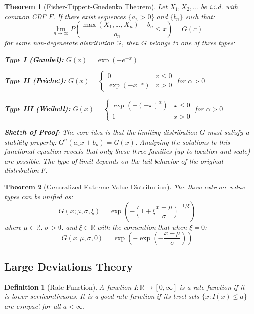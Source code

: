 \documentclass[12pt,a4paper]{article}
\newtheorem{theorem}{Theorem}[section]
\newtheorem{definition}{Definition}[section]
\theoremstyle{remark}
\begin{document}
\begin{theorem}[Fisher-Tippett-Gnedenko Theorem]
Let $X_1, X_2, \ldots$ be i.i.d. with common CDF $F$. If there exist sequences $\{a_n > 0\}$ and $\{b_n\}$ such that:
$$\lim_{n \to \infty} P\left(\frac{\max(X_1, \ldots, X_n) - b_n}{a_n} \leq x\right) = G(x)$$
for some non-degenerate distribution $G$, then $G$ belongs to one of three types:

\textbf{Type I (Gumbel):} $G(x) = \exp(-e^{-x})$

\textbf{Type II (Fréchet):} $G(x) = \begin{cases} 0 & x \leq 0 \\ \exp(-x^{-\alpha}) & x > 0 \end{cases}$ for $\alpha > 0$

\textbf{Type III (Weibull):} $G(x) = \begin{cases} \exp(-(-x)^{\alpha}) & x \leq 0 \\ 1 & x > 0 \end{cases}$ for $\alpha > 0$

\textbf{Sketch of Proof:} The core idea is that the limiting distribution $G$ must satisfy a stability property: $G^n(a_n x + b_n) = G(x)$. Analyzing the solutions to this functional equation reveals that only these three families (up to location and scale) are possible. The type of limit depends on the tail behavior of the original distribution $F$.
\end{theorem}

\begin{theorem}[Generalized Extreme Value Distribution]
The three extreme value types can be unified as:
$$G(x; \mu, \sigma, \xi) = \exp\left(-\left(1 + \xi\frac{x-\mu}{\sigma}\right)^{-1/\xi}\right)$$
where $\mu \in \mathbb{R}$, $\sigma > 0$, and $\xi \in \mathbb{R}$ with the convention that when $\xi = 0$:
$$G(x; \mu, \sigma, 0) = \exp\left(-\exp\left(-\frac{x-\mu}{\sigma}\right)\right)$$
\end{theorem}

\subsection{Large Deviations Theory}

\begin{definition}[Rate Function]
A function $I: \mathbb{R} \to [0, \infty]$ is a rate function if it is lower semicontinuous. It is a good rate function if its level sets $\{x: I(x) \leq a\}$ are compact for all $a < \infty$.
\end{definition}
\end{document}
